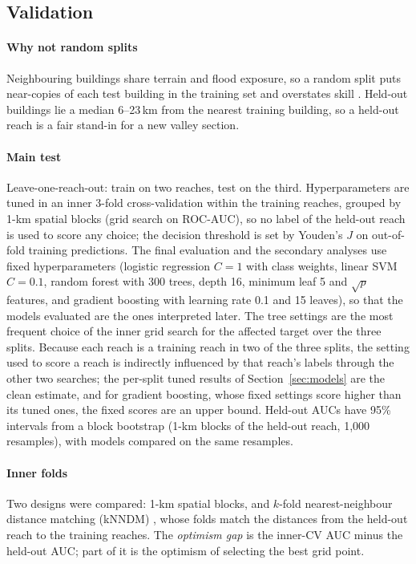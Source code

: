 \documentclass[journal,a4paper]{IEEEtran}
\begin{document}
\subsection{Validation}
\paragraph{Why not random splits} Neighbouring buildings share terrain and flood exposure, so a random split puts near-copies of each test building in the training set and overstates skill \citep{currie2026,meyer2022}. Held-out buildings lie a median 6--23\,km from the nearest training building, so a held-out reach is a fair stand-in for a new valley section.
\paragraph{Main test} Leave-one-reach-out: train on two reaches, test on the third. Hyperparameters are tuned in an inner 3-fold cross-validation within the training reaches, grouped by 1-km spatial blocks (grid search on ROC-AUC), so no label of the held-out reach is used to score any choice; the decision threshold is set by Youden's $J$ on out-of-fold training predictions. The final evaluation and the secondary analyses use fixed hyperparameters (logistic regression $C = 1$ with class weights, linear SVM $C = 0.1$, random forest with 300 trees, depth 16, minimum leaf 5 and $\sqrt{p}$ features, and gradient boosting with learning rate 0.1 and 15 leaves), so that the models evaluated are the ones interpreted later. The tree settings are the most frequent choice of the inner grid search for the affected target over the three splits. Because each reach is a training reach in two of the three splits, the setting used to score a reach is indirectly influenced by that reach's labels through the other two searches; the per-split tuned results of Section~\ref{sec:models} are the clean estimate, and for gradient boosting, whose fixed settings score higher than its tuned ones, the fixed scores are an upper bound. Held-out AUCs have 95\% intervals from a block bootstrap (1-km blocks of the held-out reach, 1,000 resamples), with models compared on the same resamples.
\paragraph{Inner folds} Two designs were compared: 1-km spatial blocks, and $k$-fold nearest-neighbour distance matching (kNNDM) \citep{linnenbrink2024,mila2022}, whose folds match the distances from the held-out reach to the training reaches. The \emph{optimism gap} is the inner-CV AUC minus the held-out AUC; part of it is the optimism of selecting the best grid point.
\end{document}
